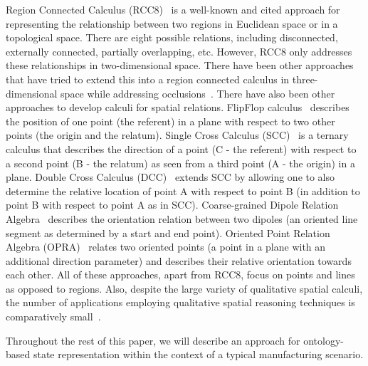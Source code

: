 \documentclass[preprint,12pt]{elsarticle}
\begin{document}
Region Connected Calculus (RCC8)~\cite{Wolter.KR.2000} is a well-known and cited approach for representing the relationship between two regions in Euclidean space or in a topological space. There are eight possible relations, including disconnected, externally connected, partially overlapping, etc. However, RCC8 only addresses these relationships in two-dimensional space. There have been other approaches that have tried to extend this into a region connected calculus in three-dimensional space while addressing occlusions~\cite{Albath.CAINE.2010}. There have also been other approaches to develop calculi for spatial relations. FlipFlop calculus~\cite{Ligozat.1993} describes the position of one point (the referent) in a plane with respect to two other points (the origin and the relatum). Single Cross Calculus (SCC)~\cite{Freksa.LNCS.1992}  is a ternary calculus that describes the direction of a point (C - the referent) with respect to a second point (B - the relatum) as seen from a third point (A - the origin) in a plane. Double Cross Calculus (DCC)~\cite{Freksa.LNCS.1992} extends SCC by allowing one to also determine the relative location of point A with respect to point B (in addition to point B with respect to point A as in SCC). Coarse-grained Dipole Relation Algebra~\cite{Schlieder.1995} describes the orientation relation between two dipoles (an oriented line segment as determined by a start and end point). Oriented Point Relation Algebra (OPRA)~\cite{Moratz.IJCAI.2005} relates two oriented points (a point in a plane with an additional direction parameter) and describes their relative orientation towards each other. All of these approaches, apart from RCC8, focus on points and lines as opposed to regions. Also, despite the large variety of qualitative spatial calculi, the number of applications employing qualitative spatial reasoning techniques is comparatively small~\cite{Wallgrun.ICSC.2007}.

Throughout the rest of this paper, we will describe an approach for ontology-based state representation within the context of a typical manufacturing scenario.

\end{document}
